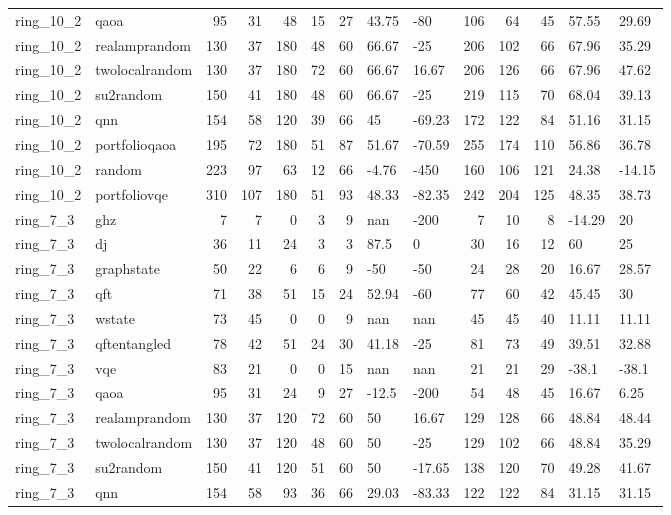 \begin{longtable}{llrrrrrllrrrll}
ring\_10\_2 & qaoa & 95 & 31 & 48 & 15 & 27 & 43.75 & -80 & 106 & 64 & 45 & 57.55 & 29.69 \\
ring\_10\_2 & realamprandom & 130 & 37 & 180 & 48 & 60 & 66.67 & -25 & 206 & 102 & 66 & 67.96 & 35.29 \\
ring\_10\_2 & twolocalrandom & 130 & 37 & 180 & 72 & 60 & 66.67 & 16.67 & 206 & 126 & 66 & 67.96 & 47.62 \\
ring\_10\_2 & su2random & 150 & 41 & 180 & 48 & 60 & 66.67 & -25 & 219 & 115 & 70 & 68.04 & 39.13 \\
ring\_10\_2 & qnn & 154 & 58 & 120 & 39 & 66 & 45 & -69.23 & 172 & 122 & 84 & 51.16 & 31.15 \\
ring\_10\_2 & portfolioqaoa & 195 & 72 & 180 & 51 & 87 & 51.67 & -70.59 & 255 & 174 & 110 & 56.86 & 36.78 \\
ring\_10\_2 & random & 223 & 97 & 63 & 12 & 66 & -4.76 & -450 & 160 & 106 & 121 & 24.38 & -14.15 \\
ring\_10\_2 & portfoliovqe & 310 & 107 & 180 & 51 & 93 & 48.33 & -82.35 & 242 & 204 & 125 & 48.35 & 38.73 \\
ring\_7\_3 & ghz & 7 & 7 & 0 & 3 & 9 & nan & -200 & 7 & 10 & 8 & -14.29 & 20 \\
ring\_7\_3 & dj & 36 & 11 & 24 & 3 & 3 & 87.5 & 0 & 30 & 16 & 12 & 60 & 25 \\
ring\_7\_3 & graphstate & 50 & 22 & 6 & 6 & 9 & -50 & -50 & 24 & 28 & 20 & 16.67 & 28.57 \\
ring\_7\_3 & qft & 71 & 38 & 51 & 15 & 24 & 52.94 & -60 & 77 & 60 & 42 & 45.45 & 30 \\
ring\_7\_3 & wstate & 73 & 45 & 0 & 0 & 9 & nan & nan & 45 & 45 & 40 & 11.11 & 11.11 \\
ring\_7\_3 & qftentangled & 78 & 42 & 51 & 24 & 30 & 41.18 & -25 & 81 & 73 & 49 & 39.51 & 32.88 \\
ring\_7\_3 & vqe & 83 & 21 & 0 & 0 & 15 & nan & nan & 21 & 21 & 29 & -38.1 & -38.1 \\
ring\_7\_3 & qaoa & 95 & 31 & 24 & 9 & 27 & -12.5 & -200 & 54 & 48 & 45 & 16.67 & 6.25 \\
ring\_7\_3 & realamprandom & 130 & 37 & 120 & 72 & 60 & 50 & 16.67 & 129 & 128 & 66 & 48.84 & 48.44 \\
ring\_7\_3 & twolocalrandom & 130 & 37 & 120 & 48 & 60 & 50 & -25 & 129 & 102 & 66 & 48.84 & 35.29 \\
ring\_7\_3 & su2random & 150 & 41 & 120 & 51 & 60 & 50 & -17.65 & 138 & 120 & 70 & 49.28 & 41.67 \\
ring\_7\_3 & qnn & 154 & 58 & 93 & 36 & 66 & 29.03 & -83.33 & 122 & 122 & 84 & 31.15 & 31.15 \\

\end{longtable}
